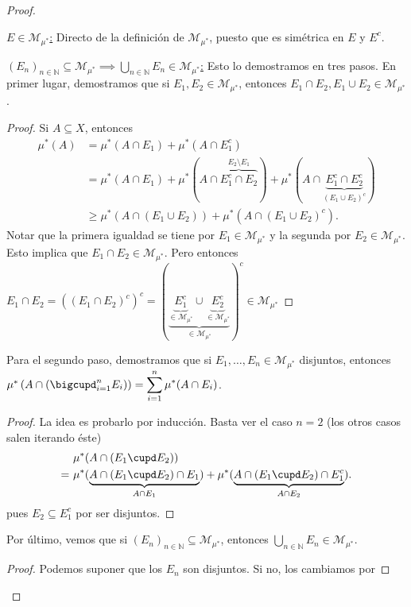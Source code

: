 \documentclass[11pt]{article}
\theoremstyle{definition} %
\newcommand{\N}{\mathbb{N}}
\begin{document}
\begin{property}
\begin{proof}
\begin{enumerate}
		\underline{$E \in \mathscr{M}_{\mu^{*}}$:} Directo de la definición de $\mathscr{M}_{\mu^{*}}$, puesto que es simétrica en $E$ y $E^c$.

		\underline{$(E_n)_{n\in\N} \subseteq \mathscr{M}_{\mu^{*}} \implies \bigcup_{n\in\N} E_n \in \mathscr{M}_{\mu^{*}}$:} Esto lo demostramos en tres pasos. En primer lugar, demostramos que si $E_1,E_2 \in \mathscr{M}_{\mu^{*}}$, entonces $E_1 \cap E_2, E_1 \cup E_2 \in \mathscr{M}_{\mu^{*}}$.
		\begin{proof}
			Si $A \subseteq X$, entonces
			\begin{align*}
				\mu^{*}(A) & = \mu^{*}(A \cap E_1) + \mu^{*}(A \cap E_1^c) \\
				& = \mu^{*}(A \cap E_1) + \mu^{*}(A \cap \overbrace{E_1^c \cap E_2}^{E_2 \setminus E_1}) + \mu^{*}(A \cap \underbrace{E_1^c \cap E_2^c}_{(E_1 \cup E_2)^c}) \\
				& \geq \mu^{*}(A \cap (E_1 \cup E_2)) + \mu^{*}(A \cap (E_1 \cup E_2)^c) 
			.\end{align*}
			Notar que la primera igualdad se tiene por $E_1 \in \mathscr{M}_{\mu^{*}}$ y la segunda por $E_2 \in \mathscr{M}_{\mu^{*}}$. Esto implica que $E_1 \cap E_2 \in \mathscr{M}_{\mu^{*}}$. Pero entonces $E_1 \cap E_2 = ((E_1 \cap E_2)^c)^c = (\underbrace{\underbrace{E_{1}^c}_{\in \mathscr{M}_{\mu^{*}}} \cup \underbrace{E_{2}^c}_{\in \mathscr{M}_{\mu^{*}}}}_{\in \mathscr{M}_{\mu^{*}}})^c \in \mathscr{M}_{\mu^{*}}$
		\end{proof}
		Para el segundo paso, demostramos que si $E_1,\dots,E_n \in \mathscr{M}_{\mu^{*}}$ disjuntos, entonces $\mu^{*}\left(A \cap \left(\displaystyle\bigcupd_{i=1}^{n} E_i \right)\right) = \displaystyle\sum_{i=1}^{n} \mu^{*}(A \cap E_i)$.
		\begin{proof}
			La idea es probarlo por inducción. Basta ver el caso $n=2$ (los otros casos salen iterando éste)
			\begin{align*}
				& \mu^{*}(A \cap (E_1 \cupd E_2)) \\
				= \ & \mu^{*}(\underbrace{A \cap (E_1 \cupd E_2) \cap E_1}_{A \cap E_1}) + \mu^{*}(\underbrace{A \cap (E_1 \cupd E_2) \cap E_1^c}_{A \cap E_2}) 
			.\end{align*}
			pues $E_2 \subseteq E_1^c$ por ser disjuntos.
		\end{proof}
		Por último, vemos que si $(E_n)_{n\in\N} \subseteq \mathscr{M}_{\mu^{*}}$, entonces $\bigcup_{n\in\N} E_n \in \mathscr{M}_{\mu^{*}}$.
		\begin{proof}
			Podemos suponer que los $E_n$ son disjuntos. Si no, los cambiamos por

\end{proof}
\end{enumerate}
\end{proof}
\end{property}
\end{document}
